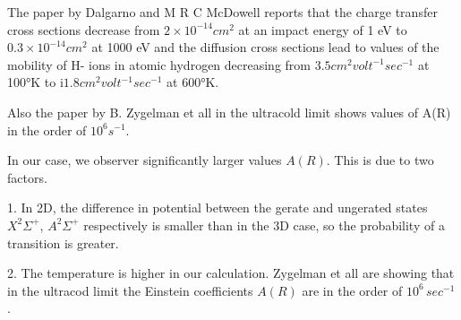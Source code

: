 The paper by Dalgarno and  M R C McDowell \cite{DalgarnoMcDowel} reports that the charge transfer cross sections decrease from $ 2 × 10^{-14} cm^2 $ at an impact energy of 1 eV to $ 0.3 × 10^{-14} cm^2 $ at 1000 eV and the diffusion cross sections lead to values of the mobility of H- ions in atomic hydrogen decreasing from $ 3.5 cm^2 volt^{-1} sec^{-1} $ at 100°K to i$ 1.8 cm^2 volt^{-1} sec^{-1} $ at 600°K.

Also the paper by B. Zygelman et all \cite{ZL} in the ultracold limit shows values of A(R) in the order of $ 10^6 s^{-1} $.

In our case, we observer significantly larger values $ A(R) $. This is due to two factors.

1. In 2D, the difference in potential between the gerate and ungerated states $ X^2\Sigma^+ $, $ A^2\Sigma^+ $ respectively is smaller than in the 3D case, so the probability of a transition is greater.

2. The temperature is higher in our calculation. Zygelman et all \cite{ZL} are showing that in the ultracod limit the Einstein coefficients $ A(R) $ are in the order of $ 10^6\, sec^{-1} $.
